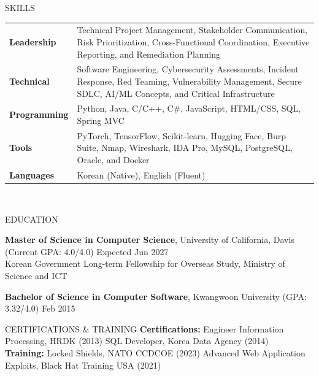 \documentclass{resume}
\begin{document}
\begin{rSection}{SKILLS}
\begin{tabular}{ @{} >{\bfseries}l @{\hspace{2ex}} p{} }
Leadership & Technical Project Management, Stakeholder Communication, Risk Prioritization, Cross-Functional Coordination, Executive Reporting, and Remediation Planning \\
Technical & Software Engineering, Cybersecurity Assessments, Incident Response, Red Teaming, Vulnerability Management, Secure SDLC, AI/ML Concepts, and Critical Infrastructure \\
Programming & Python, Java, C/C++, C\#, JavaScript, HTML/CSS, SQL, Spring MVC \\
Tools & PyTorch, TensorFlow, Scikit-learn, Hugging Face, Burp Suite, Nmap, Wireshark, IDA Pro, MySQL, PostgreSQL, Oracle, and Docker \\
Languages & Korean (Native), English (Fluent) \\
\end{tabular}\\
\end{rSection}

\begin{rSection}{EDUCATION}

{\bf Master of Science in Computer Science}, University of California, Davis (Current GPA: 4.0/4.0) \hfill {Expected Jun 2027}\\
Korean Government Long-term Fellowship for Overseas Study, Ministry of Science and ICT

{\bf Bachelor of Science in Computer Software}, Kwangwoon University (GPA: 3.32/4.0) \hfill {Feb 2015}

\end{rSection}

\begin{rSection}{CERTIFICATIONS \& TRAINING}
\textbf{Certifications:} Engineer Information Processing, HRDK (2013) \quad SQL Developer, Korea Data Agency (2014) \\
\textbf{Training:} Locked Shields, NATO CCDCOE (2023) \quad Advanced Web Application Exploits, Black Hat Training USA (2021)
\end{rSection}
\end{document}
